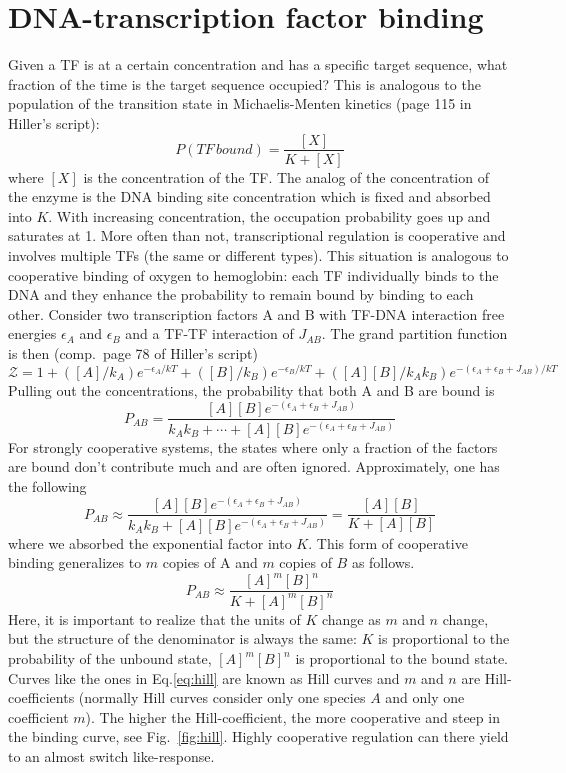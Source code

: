 \section{DNA-transcription factor binding}
Given a TF is at a certain concentration and has a specific target sequence, what fraction of the time is the target sequence occupied?
This is analogous to the population of the transition state in Michaelis-Menten kinetics (page 115 in Hiller's script):
\begin{equation}
P(TF\,bound) = \frac{[X]}{K + [X]}
\end{equation}
where $[X]$ is the concentration of the TF.
The analog of the concentration of the enzyme is the DNA binding site concentration which is fixed and absorbed into $K$.
With increasing concentration, the occupation probability goes up and saturates at 1.
More often than not, transcriptional regulation is cooperative and involves multiple TFs (the same or different types).
This situation is analogous to cooperative binding of oxygen to hemoglobin: each TF individually binds to the DNA and they enhance the probability to remain bound by binding to each other.
Consider two transcription factors A and B with TF-DNA interaction free energies $\epsilon_A$ and $\epsilon_B$ and a TF-TF interaction of $J_{AB}$.
The grand partition function is then (comp.~page 78 of Hiller's script)
\begin{equation}
	\mathcal{Z} = 1 + ([A]/k_A) e^{-\epsilon_A/kT} + ([B]/k_B) e^{-\epsilon_B/kT} + ([A][B]/k_Ak_B)e^{-(\epsilon_A+\epsilon_B+J_{AB})/kT}
\end{equation}
Pulling out the concentrations, the probability that both A and B are bound is
\begin{equation}
	P_{AB} = \frac{[A][B]e^{-(\epsilon_A+\epsilon_B + J_{AB})}}{k_Ak_B +\cdots+ [A][B]e^{-(\epsilon_A+\epsilon_B+ J_{AB})}}
\end{equation}
For strongly cooperative systems, the states where only a fraction of the factors are bound don't contribute much and are often ignored.
Approximately, one has the following
\begin{equation}
	P_{AB} \approx \frac{[A][B]e^{-(\epsilon_A+\epsilon_B + J_{AB})}}{k_Ak_B + [A][B]e^{-(\epsilon_A+\epsilon_B+ J_{AB})}} = \frac{[A][B]}{K + [A][B]}
\end{equation}
where we absorbed the exponential factor into $K$.
This form of cooperative binding generalizes to $m$ copies of A and $m$ copies of $B$ as follows.
\begin{equation}
	P_{AB} \approx \frac{[A]^m[B]^n}{K + [A]^m[B]^n}
	\label{eq:hill}
\end{equation}
Here, it is important to realize that the units of $K$ change as $m$ and $n$ change, but the structure of the denominator is always the same:
$K$ is proportional to the probability of the unbound state, $[A]^m[B]^n$ is proportional to the bound state.
Curves like the ones in Eq.\ref{eq:hill} are known as Hill curves and $m$ and $n$ are Hill-coefficients (normally Hill curves consider only one species $A$ and only one coefficient $m$).
The higher the Hill-coefficient, the more cooperative and steep in the binding curve, see Fig.~\ref{fig:hill}.
Highly cooperative regulation can there yield to an almost switch like-response.

